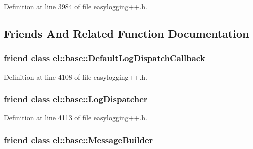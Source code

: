 Definition at line 3984 of file easylogging++.\+h.



\subsection{Friends And Related Function Documentation}
\hypertarget{classel_1_1base_1_1_storage_a42b1de96d584ae4fecbfc2b9aff95052}{}
\subsubsection[{el\+::base\+::\+Default\+Log\+Dispatch\+Callback}]{\setlength{\rightskip}{0pt plus 5cm}friend class {\bf el\+::base\+::\+Default\+Log\+Dispatch\+Callback}\hspace{0.3cm}{\ttfamily [friend]}}\label{classel_1_1base_1_1_storage_a42b1de96d584ae4fecbfc2b9aff95052}


Definition at line 4108 of file easylogging++.\+h.

\hypertarget{classel_1_1base_1_1_storage_a9b37b28ea1c5f8f862cc89f135711d92}{}
\subsubsection[{el\+::base\+::\+Log\+Dispatcher}]{\setlength{\rightskip}{0pt plus 5cm}friend class {\bf el\+::base\+::\+Log\+Dispatcher}\hspace{0.3cm}{\ttfamily [friend]}}\label{classel_1_1base_1_1_storage_a9b37b28ea1c5f8f862cc89f135711d92}


Definition at line 4113 of file easylogging++.\+h.

\hypertarget{classel_1_1base_1_1_storage_a81bbf6fe31fab133d182efa8367304f1}{}
\subsubsection[{el\+::base\+::\+Message\+Builder}]{\setlength{\rightskip}{0pt plus 5cm}friend class {\bf el\+::base\+::\+Message\+Builder}\hspace{0.3cm}{\ttfamily [friend]}}\label{classel_1_1base_1_1_storage_a81bbf6fe31fab133d182efa8367304f1}


